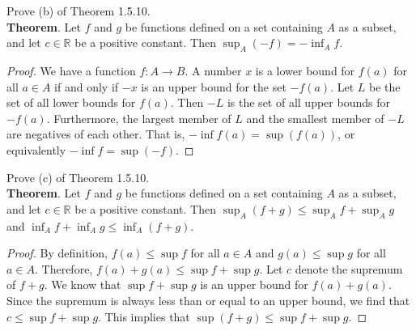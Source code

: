 \documentclass[12pt]{book}
\newenvironment{exercise}[2][Exercise]{\begin{trivlist}
\item[\hskip \labelsep {\bfseries #1}\hskip \labelsep {\bfseries #2.}]}{\end{trivlist}}
\begin{document}
\begin{exercise}{1.5.11}
Prove (b) of Theorem 1.5.10. \\

\textbf{Theorem}. Let $f$ and $g$ be functions defined on a set containing $A$ as a subset, and let $c \in \mathbb{R}$ be a positive constant. Then $\sup_A (-f) = - \inf_A f$.

	\begin{proof}
	We have a function $f: A \to B$. A number $x$ is a lower bound for $f(a)$ for all $a \in A$ if and only if $-x$ is an upper bound for the set $-f(a)$. Let  $L$ be the set of all lower bounds for $f(a)$. Then $-L$ is the set of all upper bounds for $-f(a)$. Furthermore, the largest member of $L$ and the smallest member of $-L$ are negatives of each other. That is, $- \inf f(a) = \sup (f(a))$, or equivalently $- \inf f = \sup (-f)$.  
	\end{proof}
\end{exercise}

\begin{exercise}{1.5.12}
Prove (c) of Theorem 1.5.10.\\

\textbf{Theorem}. Let $f$ and $g$ be functions defined on a set containing $A$ as a subset, and let $c \in \mathbb{R}$ be a positive constant. Then $\sup_A (f+g) \leq \sup_A f + \sup_A g $ and $\inf_A f + \inf_A g \leq \inf_A (f+g)$.

	\begin{proof}
	By definition, $f(a) \leq \sup f$ for all $a \in A$ and $g(a) \leq \sup g$ for all $a \in A$. Therefore, $f(a)+g(a) \leq \sup f + \sup g$. Let $c$ denote the supremum of $f+g$. We know that $\sup f + \sup g$ is an upper bound  for $f(a)+g(a)$. Since the supremum is always less than or equal to an upper bound, we find that $c \leq \sup f + \sup g$. This implies that $\sup (f+g) \leq \sup f + \sup g$.
	\end{proof}
\end{exercise}
\end{document}
